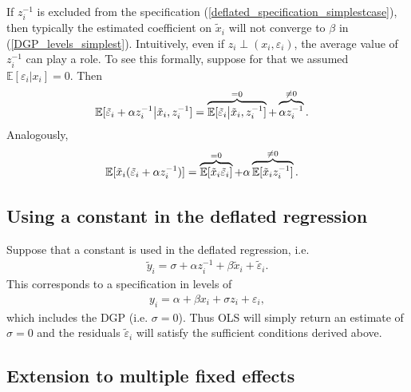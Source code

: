 \documentclass[11pt,english]{article}
\theoremstyle{definition}
\begin{document}
If $z_i^{-1}$ is excluded from the specification (\ref{deflated_specification_simplestcase}), then typically the estimated coefficient on $\tilde{x}_i$ will not converge to $\beta$ in (\ref{DGP_levels_simplest}). Intuitively, even if $z_i \perp (x_i, \varepsilon_i)$, the average value of $z_i^{-1}$ can play a role. To see this formally, suppose for that we assumed $\mathbb{E}[\varepsilon_i | x_i ] = 0$. Then
\begin{align}
	\mathbb{E}[\tilde{\varepsilon}_i + \alpha z_i^{-1} \big| \tilde{x}_i , z_i^{-1}] &=   \overbrace{\mathbb{E} [ \tilde{\varepsilon}_i \big| \tilde{x}_i, z_i^{-1}]}^{\mathclap{= 0}} + \overbrace{\alpha z_i^{-1}}^{\mathclap{\ne 0}}.
\end{align}
Analogously,
\begin{align}
	\mathbb{E}[\tilde{x}_i (\tilde{\varepsilon}_i + \alpha z_i^{-1})] &= \overbrace{\mathbb{E}[\tilde{x}_i \tilde{\varepsilon}_i]}^{\mathclap{= 0}} + \alpha \overbrace{\mathbb{E}[\tilde{x}_i z_i^{-1}]}^{\mathclap{\ne 0}}.
\end{align}

\subsection{Using a constant in the deflated regression}

Suppose that a constant is used in the deflated regression, i.e.
\begin{align}
	\tilde{y}_i = \sigma + \alpha z_i^{-1} + \beta \tilde{x}_i + \tilde{\varepsilon}_i. \label{specification_simplestcase_deflated_constant}
\end{align}
This corresponds to a specification in levels of 
\begin{align}
	y_i = \alpha + \beta x_i + \sigma z_i + \varepsilon_i, 
\end{align}
which includes the DGP (i.e. $\sigma = 0$). Thus OLS will simply return an estimate of $\sigma = 0$ and the residuals $\tilde{\varepsilon}_i$ will satisfy the sufficient conditions derived above. 

\subsection{Extension to multiple fixed effects}
\end{document}

